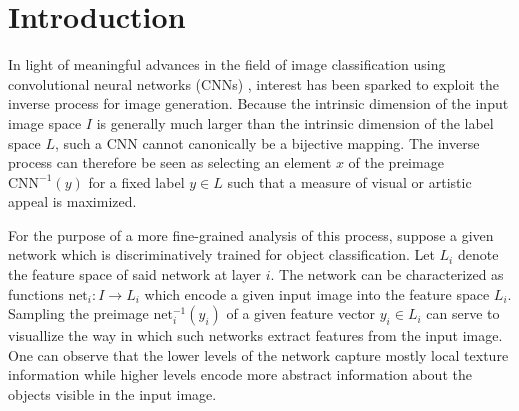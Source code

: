 
\section{Introduction}
\label{section:introduction}


In light of meaningful advances in the field of image classification using convolutional neural networks (CNNs) \cite{vgg2014}, interest has been sparked to exploit the inverse process for image generation. Because the intrinsic dimension of the input image space \(I\) is generally much larger than the intrinsic dimension of the label space \(L\), such a CNN cannot canonically be a bijective mapping. The inverse process can therefore be seen as selecting an element \(x\) of the preimage \(\mathrm{CNN}^{-1}(y)\) for a fixed label \(y\in L\) such that a measure of visual or artistic appeal is maximized.

For the purpose of a more fine-grained analysis of this process, suppose a given network which is discriminatively trained for object classification. Let \(L_i\) denote the feature space of said network at layer \(i\). The network can be characterized as functions \(\text{net}_i\colon I \to L_i\) which encode a given input image into the feature space \(L_i\). Sampling the preimage \(\text{net}_i^{-1}(y_i)\) of a given feature vector \(y_i\in L_i\) can serve to visuallize the way in which such networks extract features from the input image. One can observe that the lower levels of the network capture mostly local texture information while higher levels encode more abstract information about the objects visible in the input image.


